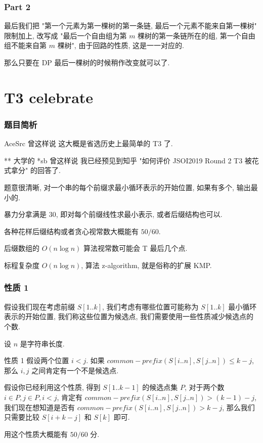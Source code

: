 \documentclass{beamer}
\begin{document}
\begin{frame}
\frametitle{Part 2}
最后我们把 "第一个元素为第一棵树的第一条链, 最后一个元素不能来自第一棵树" 限制加上, 
改写成 "最后一个自由组为第 $m$ 棵树的第一条链所在的组, 第一个自由组不能来自第 $m$ 棵树", 由于回路的性质, 这是一一对应的. 

那么只要在 DP 最后一棵树的时候稍作改变就可以了. 
\end{frame}

\section{T3 celebrate}

\begin{frame}
\frametitle{题目简析}
\begin{block}{AceSrc 曾这样说}
这大概是省选历史上最简单的 T3 了.  
\end{block}

\begin{block}{** 大学的 *sb 曾这样说}
我已经预见到知乎 "如何评价 JSOI2019 Round 2 T3 被花式拿分" 的回答了. 
\end{block}

题意很清晰, 对一个串的每个前缀求最小循环表示的开始位置, 如果有多个, 输出最小的. 

暴力分拿满是 $30$, 即对每个前缀线性求最小表示, 或者后缀结构也可以. 

各种花样后缀结构或者贪心视常数大概能有 $50/60$. 

后缀数组的 $O(n\log n)$ 算法视常数可能会 T 最后几个点. 

标程复杂度 $O(n\log n)$, 算法 z-algorithm, 就是俗称的扩展 KMP.
\end{frame}

\begin{frame}
\frametitle{性质 1}

假设我们现在考虑前缀 $S[1..k]$, 我们考虑有哪些位置可能称为 $S[1..k]$ 最小循环表示的开始位置, 我们称这些位置为候选点, 
我们需要使用一些性质减少候选点的个数.  

设 $n$ 是字符串长度. 

\begin{block}{性质 1}
假设两个位置 $i < j$. 如果 $common-prefix(S[i..n], S[j..n]) \le k - j$, 那么 $i, j$ 之间肯定有一个不是候选点. 
\end{block}

假设你已经利用这个性质, 得到 $S[1..k - 1]$ 的候选点集 $P$, 对于两个数 $i \in P, j \in P, i < j$, 肯定有
$common-prefix(S[i..n], S[j..n]) > (k - 1) - j$, 我们现在想知道是否有 $common-prefix(S[i..n], S[j..n]) > k - j$, 
那么我们只需要比较 $S[i + k - j]$ 和 $S[k]$ 即可. 

用这个性质大概能有 $50/60$ 分. 

\end{frame}
\end{document}
